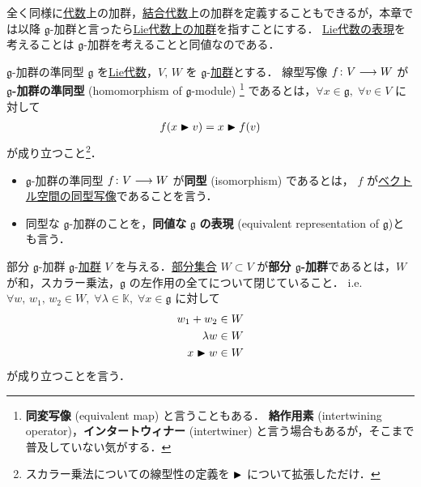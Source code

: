 \documentclass[rep_main]{subfiles}
\begin{document}
全く同様に\hyperref[def:Alg]{代数}上の加群，\hyperref[def:Alg]{結合代数}上の加群を定義することもできるが，本章では以降 $\mathfrak{g}$-加群と言ったら\hyperref[ax:g-module]{Lie代数上の加群}を指すことにする．
\hyperref[def:rep-LieAlg]{Lie代数の表現}を考えることは $\mathfrak{g}$-加群を考えることと同値なのである．

\begin{mydef}[label=def:g-module-hom]{$\mathfrak{g}$-加群の準同型}
    $\mathfrak{g}$ を\hyperref[ax:LieAlg]{Lie代数}，$V,\, W$ を $\mathfrak{g}$-\hyperref[ax:g-module]{加群}とする．
    線型写像 $f \colon V \longrightarrow W$ が $\bm{\mathfrak{g}}$\textbf{-加群の準同型} (homomorphism of $\mathfrak{g}$-module)
    \footnote{
        \textbf{同変写像} (equivalent map) と言うこともある．
        \textbf{絡作用素} (intertwining operator)，\textbf{インタートウィナー} (intertwiner) と言う場合もあるが，そこまで普及していない気がする．
    } であるとは，$\forall x \in \mathfrak{g},\; \forall v \in V$ に対して
    \begin{align}
        f(x \blacktriangleright v) = x \blacktriangleright f(v)
    \end{align}
    が成り立つこと\footnote{スカラー乗法についての線型性の定義を $\blacktriangleright$ について拡張しただけ．}．
    \tcblower
    \begin{itemize}
        \item $\mathfrak{g}$-加群の準同型 $f \colon V \longrightarrow W$ が\textbf{同型} (isomorphism) であるとは，
        $f$ が\underline{ベクトル空間の同型写像}であることを言う．
        \item 同型な $\mathfrak{g}$-加群のことを，\textbf{同値な} $\bm{\mathfrak{g}}$ \textbf{の表現} (equivalent representation of $\mathfrak{g}$)とも言う．
    \end{itemize}
\end{mydef}

\begin{mydef}[label=def:sub-g-module]{部分 $\mathfrak{g}$-加群}
	$\mathfrak{g}$-\hyperref[ax:g-module]{加群} $V$ を与える．\underline{部分集合} $W \subset V$ が\textbf{部分 $\bm{\mathfrak{g}}$-加群}であるとは，$W$ が和，スカラー乗法，$\mathfrak{g}$ の左作用の全てについて閉じていること．
	i.e. $\forall w,\, w_1,\, w_2 \in W,\; \forall \lambda \in \mathbb{K},\; \forall x \in \mathfrak{g}$ に対して
	\begin{align}
		w_1 + w_2 &\in W \\
		\lambda w &\in W \\
		x \blacktriangleright w &\in W
	\end{align}
	が成り立つことを言う．
\end{mydef}
\end{document}
